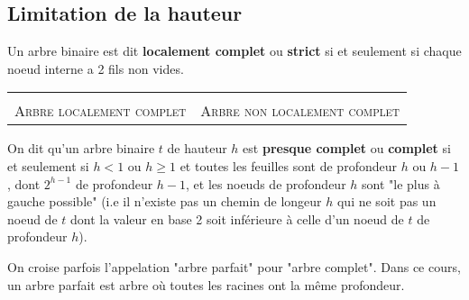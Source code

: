 \documentclass{scrartcl}
\begin{document}
		\subsection{Limitation de la hauteur}

			Un arbre binaire est dit \textbf{localement complet} ou \textbf{strict} si et seulement si chaque noeud interne a 2 fils non vides.

			\exemple
			\begin{center}
			\begin{tabularx}{0.9\linewidth}{Y | Y}
				
				&
				\\
				\textsc{Arbre localement complet} & \textsc{Arbre non localement complet}
			\end{tabularx}
			\end{center}

			On dit qu'un arbre binaire $t$ de hauteur $h$ est \textbf{presque complet} ou \textbf{complet} si et seulement si $h < 1$ ou $h \geq 1$ et toutes les feuilles sont de profondeur $h$ ou $h-1$,
			dont $2^{h-1}$ de profondeur $h-1$, et les noeuds de profondeur $h$ sont "le plus à gauche possible" 
			(i.e il n'existe pas un chemin de longeur $h$ qui ne soit pas un noeud de $t$ dont la valeur en base 2 soit inférieure à celle d'un noeud de $t$ de profondeur $h$).

			\rem On croise parfois l'appelation "arbre parfait" pour "arbre complet". Dans ce cours, un arbre parfait est arbre où toutes les racines ont la même profondeur.
\end{document}
